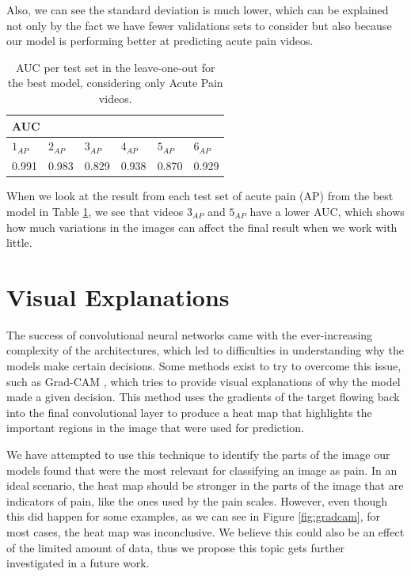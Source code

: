 Also, we can see the standard deviation is much lower, which can be explained not only by the fact we have fewer validations sets to consider but also because our model is performing better at predicting acute pain videos.

\begin{table}[h!tp]
\setlength{\tabcolsep}{3.41pt}
\centering
\caption{AUC per test set in the leave-one-out for the best model, considering only Acute Pain videos.}
\label{tab:auc_leave_one_out}
\begin{tabular}{llllll}
\hline
\multicolumn{6}{l}{AUC} \\ \hline
\multicolumn{1}{l|}{$1_{AP}$}    & \multicolumn{1}{l|}{$2_{AP}$}    & \multicolumn{1}{l|}{$3_{AP}$}    & \multicolumn{1}{l|}{$4_{AP}$}    & \multicolumn{1}{l|}{$5_{AP}$}    & $6_{AP}$   \\ \hline
\multicolumn{1}{l|}{0.991} & \multicolumn{1}{l|}{0.983} & \multicolumn{1}{l|}{0.829} & \multicolumn{1}{l|}{0.938} & \multicolumn{1}{l|}{0.870} & 0.929 \\ \hline
\end{tabular}
\end{table}

When we look at the result from each test set of acute pain (AP) from the best model in Table \ref{tab:auc_leave_one_out}, we see that videos $3_{AP}$ and $5_{AP}$ have a lower AUC, which shows how much variations in the images can affect the final result when we work with little.

\section{Visual Explanations}

The success of convolutional neural networks came with the ever-increasing complexity of the architectures, which led to difficulties in understanding why the models make certain decisions. Some methods exist to try to overcome this issue, such as Grad-CAM \citep{SelvarajuCDVPB17}, which tries to provide visual explanations of why the model made a given decision. This method uses the gradients of the target flowing back into the final convolutional layer to produce a heat map that highlights the important regions in the image that were used for prediction.

We have attempted to use this technique to identify the parts of the image our models found that were the most relevant for classifying an image as pain. In an ideal scenario, the heat map should be stronger in the parts of the image that are indicators of pain, like the ones used by the pain scales. However, even though this did happen for some examples, as we can see in Figure \ref{fig:gradcam}, for most cases, the heat map was inconclusive. We believe this could also be an effect of the limited amount of data, thus we propose this topic gets further investigated in a future work.

